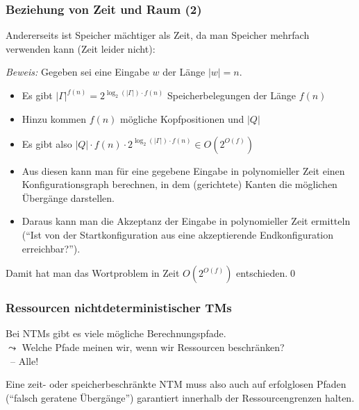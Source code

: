 \documentclass[onlymath]{beamer}
\begin{document}
\begin{frame}\frametitle{Beziehung von Zeit und Raum (2)}

Andererseits ist Speicher mächtiger als Zeit, da man Speicher mehrfach verwenden kann (Zeit leider nicht):\bigskip


\pause\emph{Beweis:} Gegeben sei eine Eingabe $w$ der Länge $|w|=n$.\pause
{\footnotesize
\begin{itemize}
\item Es gibt $|\Gamma|^{f(n)}=2^{\log_2(|\Gamma|)\cdot f(n)}$ Speicherbelegungen der Länge $f(n)$\pause
\item Hinzu kommen $f(n)$ mögliche Kopfpositionen und $|Q|$ \pause
\item Es gibt also $|Q|\cdot f(n)\cdot 2^{\log_2(|\Gamma|)\cdot f(n)}\in O(2^{O(f)})$
\pause
\item Aus diesen kann man für eine gegebene Eingabe in polynomieller Zeit einen \alert{Konfigurationsgraph} berechnen, in dem (gerichtete) Kanten die möglichen Übergänge darstellen.\pause
\item Daraus kann man die Akzeptanz der Eingabe in polynomieller Zeit ermitteln ("`Ist von der Startkonfiguration aus eine akzeptierende Endkonfiguration erreichbar?"').
\end{itemize}}
Damit hat man das Wortproblem in Zeit $O(2^{O(f)})$ entschieden.\qed
\end{frame}


\begin{frame}\frametitle{Ressourcen nichtdeterministischer TMs}

Bei NTMs gibt es viele mögliche Berechnungspfade.\\
$\leadsto$ Welche Pfade meinen wir, wenn wir Ressourcen beschränken?\\\pause
~\hfill{\alert{-- Alle!}}
\medskip


Eine zeit- oder speicherbeschränkte NTM muss also auch auf erfolglosen Pfaden ("`falsch geratene Übergänge"') garantiert
innerhalb der Ressourcengrenzen halten.

\end{frame}
\end{document}
